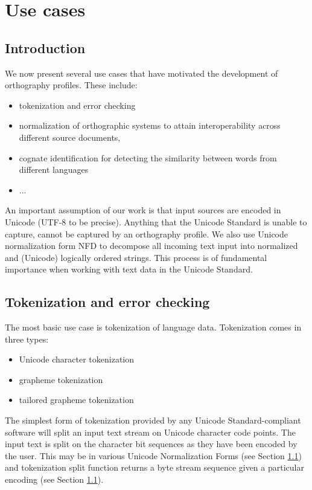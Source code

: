 \chapter{Use cases}
\label{use-cases}

\section{Introduction}

We now present several use cases that have motivated the development of
orthography profiles. These include: 

\begin{itemize}
	\item tokenization and error checking
	\item normalization of orthographic systems to attain interoperability across different source documents, 
	\item cognate identification for detecting the similarity between words from different languages 
	\item ...
\end{itemize}

An important assumption of our work is that input sources are encoded in Unicode
(UTF-8 to be precise). Anything that the Unicode Standard is unable to capture,
cannot be captured by an orthography profile. We also use Unicode normalization
form NFD to decompose all incoming text input into normalized and (Unicode)
logically ordered strings. This process is of fundamental importance when
working with text data in the Unicode Standard.

\section{Tokenization and error checking}
\label{usecase-tokenization}


The most basic use case is tokenization of language data. Tokenization comes in three types:

\begin{itemize}
	\item Unicode character tokenization
	\item grapheme tokenization
	\item tailored grapheme tokenization
\end{itemize}
	
The simplest form of tokenization provided by any Unicode Standard-compliant
software will split an input text stream on Unicode character code points. The
input text is split on the character bit sequences as they have been encoded by
the user. This may be in various Unicode Normalization Forms (see Section
\ref{}) and tokenization split function returns a byte stream sequence given a
particular encoding (see Section \ref{}).


